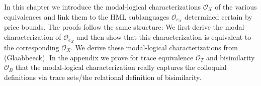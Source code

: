 %
\begin{isabellebody}%
%
%
\isadelimtheory
%
\endisadelimtheory
%
\isatagtheory
%
\endisatagtheory
{\isafoldtheory}%
%
\isadelimtheory
%
\endisadelimtheory
%
\isadelimdocument
%
\endisadelimdocument
%
\isatagdocument
%
\isamarkuptrue%
%
\endisatagdocument
{\isafolddocument}%
%
\isadelimdocument
%
\endisadelimdocument
%
\begin{isamarkuptext}%
In this chapter we introduce the modal-logical characterizations $\mathcal{O}_X$ of the various equivalences and link them to the HML sublanguages $\mathcal{O}_{e_X}$ determined 
certain by price bounds. The proofs follow the same structure: We first derive the modal characterization of $\mathcal{O}_{e_X}$ and then show that this characterization is equivalent to the corresponding $\mathcal{O}_X$.
We derive these modal-logical characterizations from (Glaabbeeck). In the appendix we prove for trace equivalence $\mathcal{O}_T$ and bisimilarity $\mathcal{O}_B$ that the modal-logical characterization really captures
the colloquial definitions via trace sets/the relational definition of bisimilarity.%
\end{isamarkuptext}\isamarkuptrue%
%
\isadelimtheory
%
\endisadelimtheory
%
\isatagtheory
%
\endisatagtheory
{\isafoldtheory}%
%
\isadelimtheory
%
\endisadelimtheory
%
\end{isabellebody}%
\endinput
